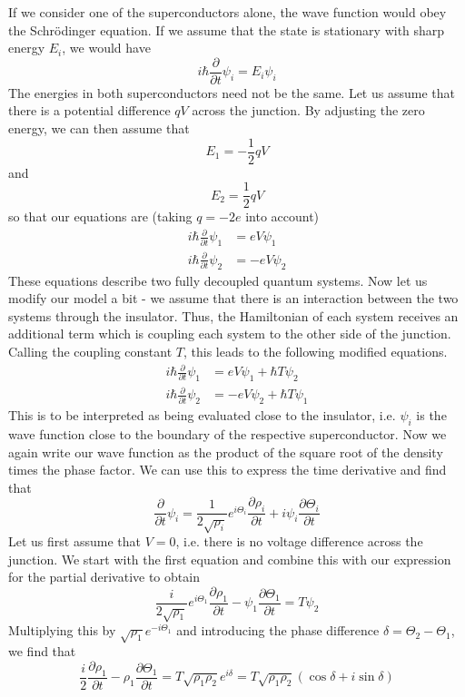 \documentclass[a4paper, draft]{article}
\theoremstyle{own}
\theoremstyle{remark}
\begin{document}
If we consider one of the superconductors alone, the wave function would obey the Schr\"odinger equation. If we assume that the state is stationary with sharp energy $E_i$, we would have
$$
i \hbar \frac{\partial }{\partial t} \psi_i = E_i \psi_i
$$
The energies in both superconductors need not be the same. Let us assume that there is a potential difference $qV$ across the junction. By adjusting the zero energy, we can then assume that
$$
E_1 = -\frac{1}{2} qV
$$
and
$$
E_2 = \frac{1}{2} qV
$$
so that our equations are (taking $q = -2e$ into account)
\begin{align*}
i \hbar \frac{\partial }{\partial t} \psi_1 &= eV \psi_1 \\
i \hbar \frac{\partial }{\partial t} \psi_2 &= -eV  \psi_2
\end{align*}
These equations describe two fully decoupled quantum systems. Now let us modify our model a bit - we assume that there is an interaction between the two systems through the insulator. Thus, the Hamiltonian of each system receives an additional term which is coupling each system to the other side of the junction. Calling the coupling constant $T$, this leads to the following modified equations.
\begin{align*}
i \hbar \frac{\partial }{\partial t} \psi_1 &= eV \psi_1 + \hbar T \psi_2 \\
i \hbar \frac{\partial }{\partial t} \psi_2 &= -eV  \psi_2 + \hbar T \psi_1
\end{align*}
This is to be interpreted as being evaluated close to the insulator, i.e. $\psi_i$ is the wave function close to the boundary of the respective superconductor. Now we again write our wave function as the product of the square root of the density times the phase factor. We can use this to express the time derivative and find that
$$
\frac{\partial }{\partial t} \psi_i = \frac{1}{2 \sqrt{\rho_i}} e^{i\Theta_i} \frac{\partial \rho_i}{\partial t} 
+
i \psi_i \frac{\partial \Theta_i}{\partial t}
$$
Let us first assume that $V = 0$, i.e. there is no voltage difference across the junction. We start with the first equation and combine this with our expression for the partial derivative to obtain
$$
 \frac{i }{2 \sqrt{\rho_1}} e^{i\Theta_1} \frac{\partial \rho_1}{\partial t} 
- 
\psi_1 \frac{\partial \Theta_1}{\partial t} =  T \psi_2
$$
Multiplying this by $\sqrt{\rho_1} e^{-i \Theta_1}$ and introducing the phase difference $\delta = \Theta_2 - \Theta_1$, we find that
$$
 \frac{i }{2} \frac{\partial \rho_1}{\partial t} 
 - 
 \rho_1 \frac{\partial \Theta_1}{\partial t}
 =
 T \sqrt{\rho_1 \rho_2} e^{i\delta} = T \sqrt{\rho_1 \rho_2} (\cos \delta + i \sin \delta)
$$
\end{document}
